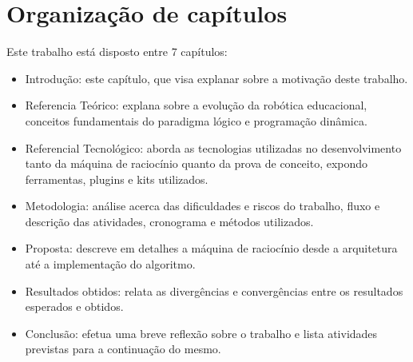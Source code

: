 \section{Organização de capítulos}
Este trabalho está disposto entre 7 capítulos:
\begin{itemize}
\item Introdução: este capítulo, que visa explanar sobre a motivação deste trabalho.
\item Referencia Teórico: explana sobre a evolução da robótica educacional, conceitos fundamentais do paradigma lógico e programação dinâmica. 
\item Referencial Tecnológico: aborda as tecnologias utilizadas no desenvolvimento
tanto da máquina de raciocínio quanto da prova de conceito, expondo ferramentas, plugins e kits utilizados.
\item Metodologia: análise acerca das dificuldades e riscos do trabalho, fluxo e descrição das atividades, cronograma e métodos utilizados.
\item Proposta: descreve em detalhes a máquina de raciocínio desde a arquitetura até a implementação do algoritmo.
\item Resultados obtidos: relata as divergências e convergências entre os resultados esperados e obtidos.
\item Conclusão: efetua uma breve reflexão sobre o trabalho e lista atividades previstas para a continuação do mesmo.

\end{itemize}


